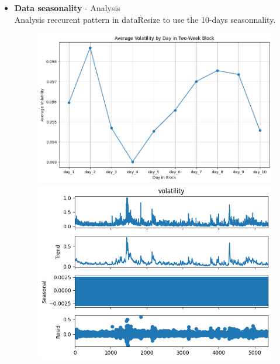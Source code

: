 \documentclass[letterpaper,11pt]{article}
\begin{document}
\begin{itemize}
  \item \textbf{Data seasonality} - Analysis\\
  Analysis reccurent pattern in dataResize to use the 10-days seasonnality.
  \begin{figure}[H]
    \centering
    \begin{minipage}[b]{0.49\textwidth}
      \centering
      \includegraphics[width=\linewidth]{img/10avg_vol.png} 
    \end{minipage}
    \hfill
    \begin{minipage}[b]{0.50\textwidth}
      \centering
      \includegraphics[width=\linewidth]{img/seaso.png}
    \end{minipage}
  \end{figure}




\end{itemize}
\end{document}
